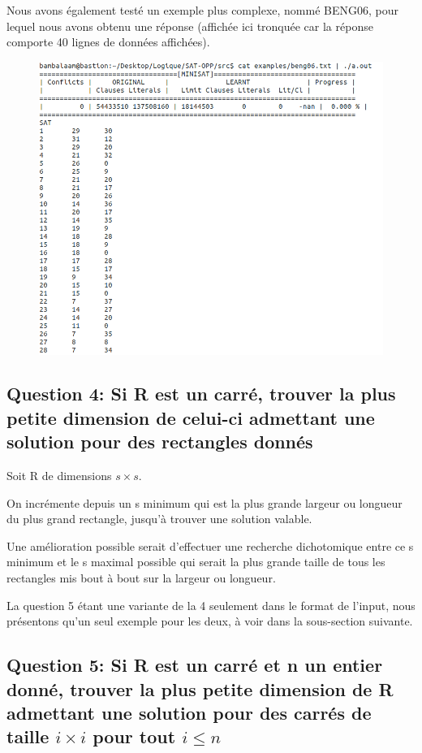 \documentclass[a4paper,10pt]{article}
\begin{document}
Nous avons également testé un exemple plus complexe, nommé BENG06, pour lequel nous avons obtenu une réponse (affichée ici tronquée car la réponse comporte 40 lignes de données affichées).

\begin{figure}[htb!]
\centering
\includegraphics[scale=0.45]{SAT-BENG06}
\end{figure}

\newpage

\subsection{Question 4: Si R est un carré, trouver la plus petite dimension de celui-ci admettant une solution pour des rectangles donnés}

Soit R de dimensions $s \times s$.

On incrémente depuis un s minimum qui est la plus grande largeur ou longueur du plus grand rectangle, jusqu'à trouver une solution valable.

Une amélioration possible serait d'effectuer une recherche dichotomique entre ce s minimum et le s maximal possible qui serait la plus grande taille de tous les rectangles mis bout à bout sur la largeur ou longueur.

La question 5 étant une variante de la 4 seulement dans le format de l'input, nous présentons qu'un seul exemple pour les deux, à voir dans la sous-section suivante.

\subsection{Question 5: Si R est un carré et n un entier donné, trouver la plus petite dimension de R admettant une solution pour des carrés de taille $i \times i$ pour tout $i \leq n$}
\end{document}
